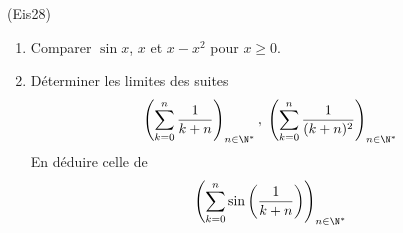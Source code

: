 \begin{tiny}(Eis28)\end{tiny}
\begin{enumerate}
  \item Comparer $\sin x$, $x$ et $x-x^2$ pour $x\geq 0$.
  \item Déterminer les limites des suites
\begin{displaymath}
\left( \sum_{k=0}^n\frac{1}{k+n}\right)_{n\in \N^*},\;
\left( \sum_{k=0}^n\frac{1}{(k+n)^2}\right)_{n\in \N^*}
\end{displaymath}
En déduire celle de
\begin{displaymath}
  \left( \sum_{k=0}^n\sin\left( \frac{1}{k+n}\right) \right)_{n\in \N^*}
\end{displaymath}

\end{enumerate}
